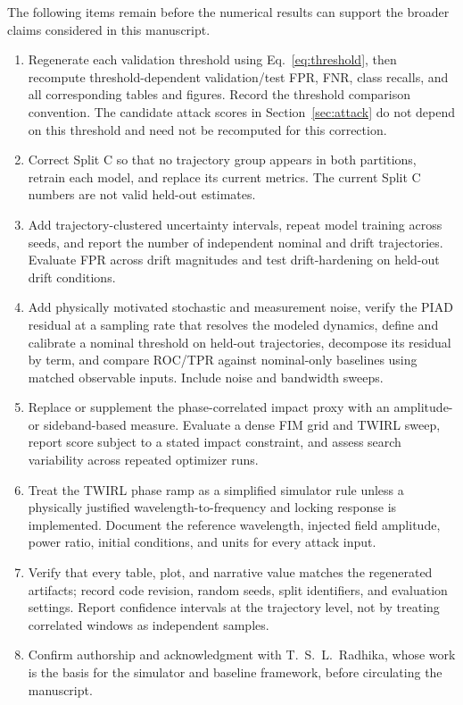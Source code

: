 \documentclass[journal,twocolumn]{IEEEtran}
\begin{document}
The following items remain before the numerical results can support the broader
claims considered in this manuscript.
\begin{enumerate}
  \item Regenerate each validation threshold using Eq.~\eqref{eq:threshold}, then
        recompute threshold-dependent validation/test FPR, FNR, class recalls, and
        all corresponding tables and figures. Record the threshold comparison
        convention. The candidate attack scores in Section~\ref{sec:attack} do not
        depend on this threshold and need not be recomputed for this correction.
  \item Correct Split C so that no trajectory group appears in both partitions,
        retrain each model, and replace its current metrics. The current Split C
        numbers are not valid held-out estimates.
  \item Add trajectory-clustered uncertainty intervals, repeat model training across
        seeds, and report the number of independent nominal and drift trajectories.
        Evaluate FPR across drift magnitudes and test drift-hardening on held-out
        drift conditions.
  \item Add physically motivated stochastic and measurement noise, verify the PIAD
residual at a sampling rate that resolves the modeled dynamics, define and calibrate
a nominal threshold on held-out trajectories, decompose
        its residual by term, and compare ROC/TPR against nominal-only baselines using
        matched observable inputs. Include noise and bandwidth sweeps.
  \item Replace or supplement the phase-correlated impact proxy with an
        amplitude- or sideband-based measure. Evaluate a dense FIM grid and TWIRL
        sweep, report score subject to a stated impact constraint, and assess search
        variability across repeated optimizer runs.
  \item Treat the TWIRL phase ramp as a simplified simulator rule unless a physically
        justified wavelength-to-frequency and locking response is implemented.
        Document the reference wavelength, injected field amplitude, power ratio,
        initial conditions, and units for every attack input.
  \item Verify that every table, plot, and narrative value matches the regenerated
        artifacts; record code revision, random seeds, split identifiers, and
        evaluation settings. Report confidence intervals at the trajectory level,
        not by treating correlated windows as independent samples.
  \item Confirm authorship and acknowledgment with T.~S.~L.~Radhika, whose work is
        the basis for the simulator and baseline framework, before circulating the
        manuscript.
\end{enumerate}
\end{document}
